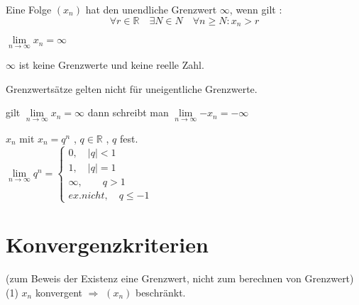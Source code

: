 \begin{definition}
    Eine Folge $(x_n)$ hat den unendliche Grenzwert $\infty$, wenn gilt : \\
    \[\forall r \in \mathbb{R} \quad \exists N \in N \quad \forall n \geq N : x_n > r \]

\begin{schreibweise}
$\lim\limits_{n \rightarrow \infty}{x_n}= \infty$
\end{schreibweise}
\end{definition}

\begin{remark}
    $\infty$ ist keine Grenzwerte und keine reelle Zahl.
\end{remark}

\begin{remark}
    Grenzwertsätze gelten nicht für uneigentliche Grenzwerte.
\end{remark}

\begin{remark}
    gilt $\lim\limits_{n \rightarrow \infty}{x_n}= \infty$ dann schreibt man $\lim\limits_{n \rightarrow \infty}{-x_n}= -\infty$
\end{remark}

\begin{example}
    $x_n$ mit $x_n = q^n$ , $q \in \mathbb{R}$ , $q$ fest.\\

    $ \lim\limits_{n \rightarrow \infty}{q^n} = \begin{cases}
                                                    0 ,\quad |q|<1 \\
                                                    1 ,\quad |q|=1 \\
                                                    \infty ,\quad\quad q > 1  \\
                                                    ex. nicht ,\quad q\leq -1
    \end{cases}$
\end{example}
\vfil

\section{Konvergenzkriterien}
(zum Beweis der Existenz eine Grenzwert, nicht zum berechnen von Grenzwert) \\


(1) $x_n$ konvergent $\Rightarrow$ $(x_n)$ beschränkt. \\

